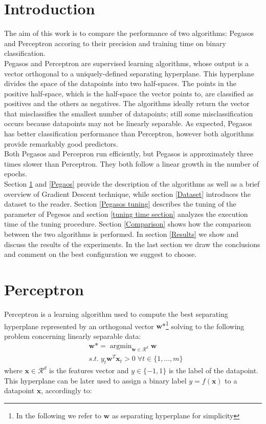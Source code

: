 \documentclass{article}
\DeclareMathOperator*{\argmin}{argmin}
\begin{document}
\section*{Introduction}
The aim of this work is to compare the performance of two algorithms: Pegasos and Perceptron accoring to their precision and training time on binary classification.\\
Pegasos and Perceptron are supervised learning algorithms, whose output is a vector orthogonal to a uniquely-defined separating hyperplane. This hyperplane divides the space of the datapoints into two half-spaces. The points in the positive half-space, which is the half-space the vector points to, are classified as positives and the others as negatives. The algorithms ideally return the vector that misclassifies the smallest number of datapoints; still some misclassification occurs because datapoints may not be linearly separable.
As expected, Pegasos has better classification performance than Perceptron, however both algorithms provide remarkably good predictors. \\
Both Pegasos and Percepron run efficiently, but Pegasos is approximately three times slower than Perceptron. They both follow a linear growth in the number of epochs. \\
Section \ref{Perceptron} and \ref{Pegaos} provide the description of the algorithms as well as a brief overview of Gradient Descent technique, while section \ref{Dataset} introduces the dataset to the reader.
Section \ref{Pegasos tuning} describes the tuning of the parameter of Pegesos and section \ref{tuning time section} analyzes the execution time of the tuning procedure. Section \ref{Comparison} shows how the comparison between the two algorithms is performed. In section \ref{Results} we show and discuss the results of the experiments.
In the last section we draw the conclusions and comment on the best configuration we suggest to choose.

\newpage
\section{Perceptron} \label{Perceptron}
Perceptron is a learning algorithm used to compute the best separating hyperplane represented by an orthogonal vector $\textbf{w} \mbox{*}$\footnote{In the following we refer to $\textbf{w}$ as separating hyperplane for simplicity} solving to the following problem concerning linearly separable data:
\begin{equation}
\begin{split}
   &   \textbf{w} \mbox{*} = \argmin_{\textbf{w} \in \mathcal{R}^d} \textbf{w} \\
   & s.t.\; y_t\textbf{w}^{T}\textbf{x}_t > 0 \; \forall t \in \{1, ...,m\} 
\end{split}
\end{equation}
\noindent where $\textbf{x} \in \mathcal{R}^d$ is the features vector and $y \in \{-1,1 \}$ is the label of the datapoint.
This hyperplane can be later used to assign a binary label $y=f(\textbf{x})$ to a datapoint $\textbf{x}$, accordingly to:
\end{document}
